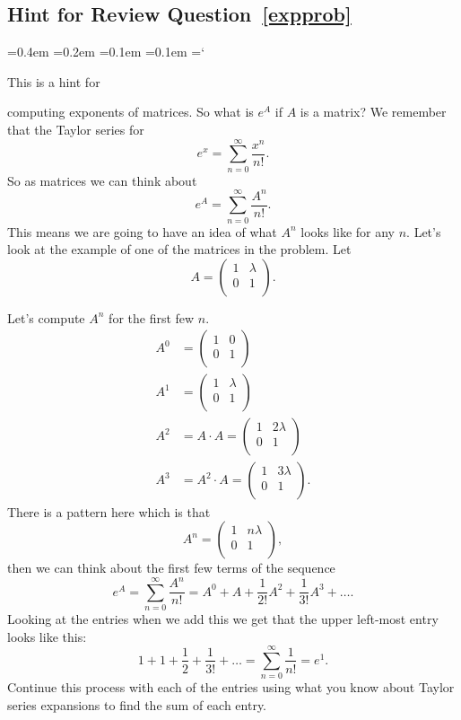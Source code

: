
\subsection*{Hint for Review Question~\ref{expprob}}

{\ttfamily
{}\font=0.4em
\font=0.2em
\font=0.1em
\font=0.1em
\hyphenchar\font=`\-

\hypertarget{properties_of_matrices_exponents}{This is a hint for} computing exponents of matrices. So what is $e^A$ if $A$ is a matrix? We remember that the Taylor series for
\[
e^x = \sum^{\infty}_{n=0} \frac{x^n}{n!}.
\]
So as matrices we can think about
\[
e^A = \sum^{\infty}_{n=0} \frac{A^n}{n!}.
\]
This means we are going to have an idea of what $A^n$ looks like for any $n$. Let's look at the example of one of the matrices in the problem. Let
\[
A = 
\left( 
\begin{array}{cc}
1 & \lambda\\
0 & 1\\
\end{array}
\right).
\]

Let's compute $A^n$ for the first few $n$. 
\begin{align*}
A^0 & =
\left(
\begin{array}{cc}
1 & 0\\
0 & 1\\
\end{array}
\right)
\\ A^1 & = 
\left(
\begin{array}{cc}
1 & \lambda \\
0 & 1\\
\end{array}
\right)
\\ A^2 & = A\cdot A = 
\left(
\begin{array}{cc}
1 & 2 \lambda \\
0 & 1\\
\end{array}
\right)
\\ A^3 & = A^2\cdot A = 
\left(
\begin{array}{cc}
1 & 3 \lambda \\
0 & 1\\
\end{array}
\right).
\end{align*}
There is a pattern here which is that 
\[ A^n = 
\left(
\begin{array}{cc}
1 & n \lambda \\
0 & 1\\
\end{array}
\right),
 \]
then we can think about the first few terms of the sequence
\[
e^A = \sum^{\infty}_{n=0} \frac{A^n}{n!} = A^0 + A + \frac{1}{2!} A^2 + \frac{1}{3!} A^3 + \ldots.
\]
Looking at the entries when we add this we get that the upper left-most entry looks like this:
\[
1 + 1 + \frac{1}{2} + \frac{1}{3!} + \ldots = \sum^{\infty}_{n=0} \frac{1}{n!} = e^1.
\]
Continue this process with each of the entries using what you know about Taylor series expansions to find the sum of each entry.
 
}
